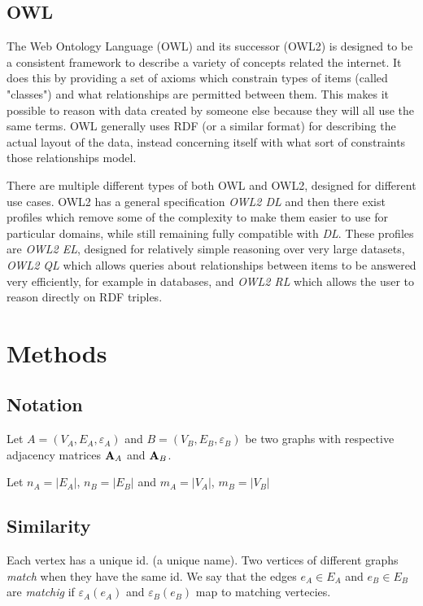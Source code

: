 \documentclass[english, 12pt]{article}
\begin{document}
\subsection{OWL}
The Web Ontology Language (OWL) and its successor (OWL2) is designed to be a consistent framework to describe a variety of concepts related the internet. It does this by providing a set of axioms which constrain types of items (called "classes") and what relationships are permitted between them. This makes it possible to reason with data created by someone else because they will all use the same terms. OWL generally uses RDF (or a similar format) for describing the actual layout of the data, instead concerning itself with what sort of constraints those relationships model.

There are multiple different types of both OWL and OWL2, designed for different use cases. OWL2 has a general specification \emph{OWL2 DL}\cite{w3c_owl2} and then there exist profiles which remove some of the complexity to make them easier to use for particular domains, while still remaining fully compatible with \emph{DL}. These profiles are \emph{OWL2 EL}, designed for relatively simple reasoning over very large datasets, \emph{OWL2 QL} which allows queries about relationships between items to be answered very efficiently, for example in databases, and \emph{OWL2 RL} which allows the user to reason directly on RDF triples.

\section{Methods}

\subsection*{Notation}

Let $A = (V_A,E_A, \varepsilon_A)$ and $B = (V_B,E_B, \varepsilon_B)$ be two graphs with respective adjacency matrices $\bold A_A$ and $\bold A_B$.

Let $n_A = |E_A|$, $n_B = |E_B|$ and $m_A = |V_A|$, $m_B = |V_B|$

\subsection{Similarity}
Each vertex has a unique id. (a unique name). Two vertices of different graphs {\it match} when they have the same id.
We say that the edges $e_A \in E_A$ and $e_B \in E_B$ are {\it matchig} if $\varepsilon_A(e_A)$ and $\varepsilon_B(e_B)$ map to matching vertecies.
\end{document}
